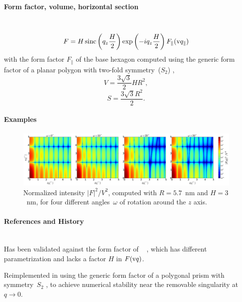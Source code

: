\paragraph{Form factor, volume, horizontal section}\strut\\
\begin{equation*}
F = H \operatorname{sinc}\left(q_z\frac{H}{2}\right) \exp\left(-i q_z\frac{ H}{2}\right) F_\parallel(\text{v}{q}_\parallel)
\end{equation*}
with the form factor $F_\parallel$ of the base hexagon
computed using the generic form factor of a planar polygon
with two-fold symmetry~($S_2$) \cite{ba:ffp},
\begin{equation*}
  V = \dfrac{3\sqrt{3}}{2}H R^2,
\end{equation*}
\begin{equation*}
  S =\dfrac{3\sqrt{3}R^2}{2}.
\end{equation*}

\paragraph{Examples}\strut\nopagebreak

\begin{figure}[H]
\begin{center}
\includegraphics[width=\textwidth]{fig/ff2/ff_Prism6.pdf}
\end{center}
\caption{Normalized intensity $|F|^2/V^2$,
computed with $R=5.7$~nm and $H=3$~nm,
for four different angles~$\omega$ of rotation around the $z$ axis.}
\label{fig:FFprism6Ex}
\end{figure}

\paragraph{References and History}\strut\\
Has been validated against the  form factor of \IsGISAXS\
\cite[Eq.~2.31]{Laz08} \cite[Eq.~221]{ReLL09},
which has different parametrization
and lacks a factor $H$ in $F(\text{v}{q})$.

Reimplemented in  using the generic form factor
of a polygonal prism with symmetry~$S_2$ \cite{ba:ffp},
to achieve numerical stability near the removable singularity at $q\to0$.


